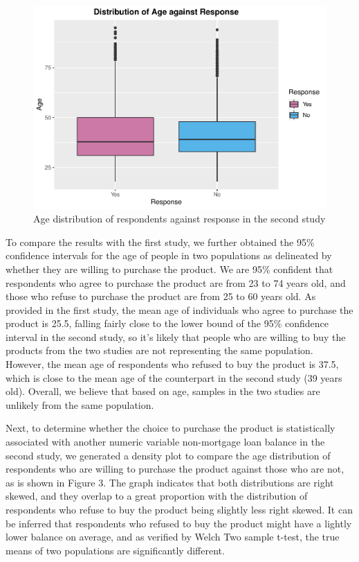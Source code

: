 \documentclass[]{article}
\begin{document}
\begin{figure}

{\centering \includegraphics{Compiled-Technical-Report_files/figure-latex/unnamed-chunk-3-1} 

}

\caption{Age distribution of respondents against response in the second study}\label{fig:unnamed-chunk-3}
\end{figure}

To compare the results with the first study, we further obtained the
95\% confidence intervals for the age of people in two populations as
delineated by whether they are willing to purchase the product. We are
95\% confident that respondents who agree to purchase the product are
from 23 to 74 years old, and those who refuse to purchase the product
are from 25 to 60 years old. As provided in the first study, the mean
age of individuals who agree to purchase the product is 25.5, falling
fairly close to the lower bound of the 95\% confidence interval in the
second study, so it's likely that people who are willing to buy the
products from the two studies are not representing the same population.
However, the mean age of respondents who refused to buy the product is
37.5, which is close to the mean age of the counterpart in the second
study (39 years old). Overall, we believe that based on age, samples in
the two studies are unlikely from the same population.

Next, to determine whether the choice to purchase the product is
statistically associated with another numeric variable non-mortgage loan
balance in the second study, we generated a density plot to compare the
age distribution of respondents who are willing to purchase the product
against those who are not, as is shown in Figure 3. The graph indicates
that both distributions are right skewed, and they overlap to a great
proportion with the distribution of respondents who refuse to buy the
product being slightly less right skewed. It can be inferred that
respondents who refused to buy the product might have a lightly lower
balance on average, and as verified by Welch Two sample t-test, the true
means of two populations are significantly different.
\end{document}
